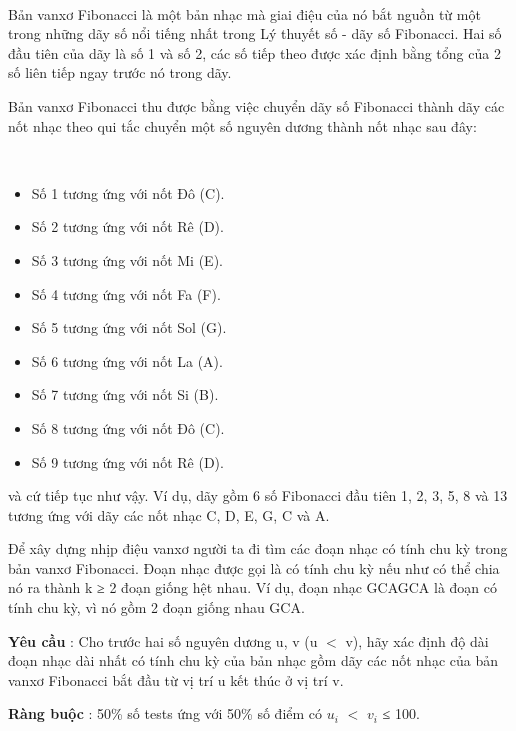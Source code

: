 

 

Bản vanxơ Fibonacci là một bản nhạc mà giai điệu của nó bắt nguồn từ một trong những dãy số nổi tiếng nhất trong Lý thuyết số - dãy số Fibonacci. Hai số đầu tiên của dãy là số 1 và số 2, các số tiếp theo được xác định bằng tổng của 2 số liên tiếp ngay trước nó trong dãy.





Bản vanxơ Fibonacci thu được bằng việc chuyển dãy số Fibonacci thành dãy các nốt nhạc theo qui tắc chuyển một số nguyên dương thành nốt nhạc sau đây:


 
\begin{itemize}
	\item Số 1 tương ứng với nốt Đô (C).
	\item Số 2 tương ứng với nốt Rê (D).
	\item Số 3 tương ứng với nốt Mi (E).
	\item Số 4 tương ứng với nốt Fa (F).
	\item Số 5 tương ứng với nốt Sol (G).
	\item Số 6 tương ứng với nốt La (A).
	\item Số 7 tương ứng với nốt Si (B).
	\item Số 8 tương ứng với nốt Đô (C).
	\item Số 9 tương ứng với nốt Rê (D).
\end{itemize}




và cứ tiếp tục như vậy. Ví dụ, dãy gồm 6 số Fibonacci đầu tiên 1, 2, 3, 5, 8 và 13 tương ứng với dãy các nốt nhạc C, D, E, G, C và A.





Để xây dựng nhịp điệu vanxơ người ta đi tìm các đoạn nhạc có tính chu kỳ trong bản vanxơ Fibonacci. Đoạn nhạc được gọi là có tính chu kỳ nếu như có thể chia nó ra thành k ≥ 2 đoạn giống hệt nhau. Ví dụ, đoạn nhạc GCAGCA là đoạn có tính chu kỳ, vì nó gồm 2 đoạn giống nhau GCA.





\textbf{Yêu cầu } : Cho trước hai số nguyên dương u, v (u $<$ v), hãy xác định độ dài đoạn nhạc dài nhất có tính chu kỳ của bản nhạc gồm dãy các nốt nhạc của bản vanxơ Fibonacci bắt đầu từ vị trí u kết thúc ở vị trí v.





\textbf{Ràng buộc } : 50\% số tests ứng với 50\% số điểm có $u_{i}$ $<$ $v_{i}$ ≤ 100.

